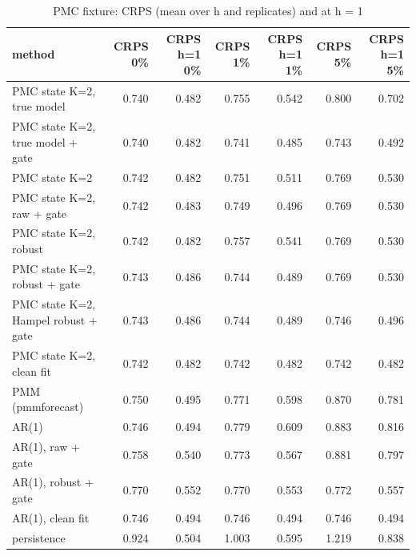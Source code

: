 \begin{table}[ht]\centering\small
\caption{PMC fixture: CRPS (mean over h and replicates) and at h = 1}
\begin{tabular}{lrrrrrr}
\hline
method & CRPS 0\% & CRPS h=1 0\% & CRPS 1\% & CRPS h=1 1\% & CRPS 5\% & CRPS h=1 5\% \\ \hline
PMC state K=2, true model & 0.740 & 0.482 & 0.755 & 0.542 & 0.800 & 0.702 \\
PMC state K=2, true model + gate & 0.740 & 0.482 & 0.741 & 0.485 & 0.743 & 0.492 \\
PMC state K=2 & 0.742 & 0.482 & 0.751 & 0.511 & 0.769 & 0.530 \\
PMC state K=2, raw + gate & 0.742 & 0.483 & 0.749 & 0.496 & 0.769 & 0.530 \\
PMC state K=2, robust & 0.742 & 0.482 & 0.757 & 0.541 & 0.769 & 0.530 \\
PMC state K=2, robust + gate & 0.743 & 0.486 & 0.744 & 0.489 & 0.769 & 0.530 \\
PMC state K=2, Hampel robust + gate & 0.743 & 0.486 & 0.744 & 0.489 & 0.746 & 0.496 \\
PMC state K=2, clean fit & 0.742 & 0.482 & 0.742 & 0.482 & 0.742 & 0.482 \\
PMM (pmmforecast) & 0.750 & 0.495 & 0.771 & 0.598 & 0.870 & 0.781 \\
AR(1) & 0.746 & 0.494 & 0.779 & 0.609 & 0.883 & 0.816 \\
AR(1), raw + gate & 0.758 & 0.540 & 0.773 & 0.567 & 0.881 & 0.797 \\
AR(1), robust + gate & 0.770 & 0.552 & 0.770 & 0.553 & 0.772 & 0.557 \\
AR(1), clean fit & 0.746 & 0.494 & 0.746 & 0.494 & 0.746 & 0.494 \\
persistence & 0.924 & 0.504 & 1.003 & 0.595 & 1.219 & 0.838 \\
\hline\end{tabular}\end{table}

